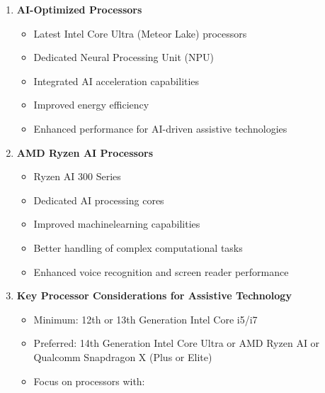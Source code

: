\begin{enumerate}

	\item \textbf{AI-Optimized Processors}

	      \begin{itemize}
		      \item Latest Intel Core Ultra (Meteor Lake) processors \supercite{IntelMeteorLake}
		      \item Dedicated Neural Processing Unit (NPU) \supercite{IntelNPU}
		      \item Integrated \gls{AI} acceleration capabilities \supercite{IntelAIAcceleration}
		      \item Improved energy efficiency \supercite{IntelPowerEfficiency}
		      \item Enhanced performance for AI-driven assistive technologies \supercite{AIinAccessibility}
	      \end{itemize}

	\item \textbf{AMD Ryzen AI Processors}

	      \begin{itemize}
		      \item Ryzen AI 300 Series \supercite{AMDRyzenAI300}
		      \item Dedicated AI processing cores \supercite{AMDAIProcessing}
		      \item Improved \gls{machinelearning} capabilities \supercite{AMDMachineLearning}
		      \item Better handling of complex computational tasks \supercite{AMDRyzenPerformance}
		      \item Enhanced voice recognition and screen reader performance \supercite{AIinAccessibility}
	      \end{itemize}

	\item \textbf{Key Processor Considerations for Assistive Technology}

	      \begin{itemize}
		      \item Minimum: 12th or 13th Generation Intel Core i5/i7 \supercite{IntelCoreRequirements}
		      \item Preferred: 14th Generation Intel Core Ultra or AMD Ryzen AI or Qualcomm Snapdragon X (Plus or Elite) \supercite{IntelMeteorLake, AMDRyzenAI, QualcommSnapdragonX}
		      \item Focus on processors with:


\end{itemize}
\end{enumerate}
